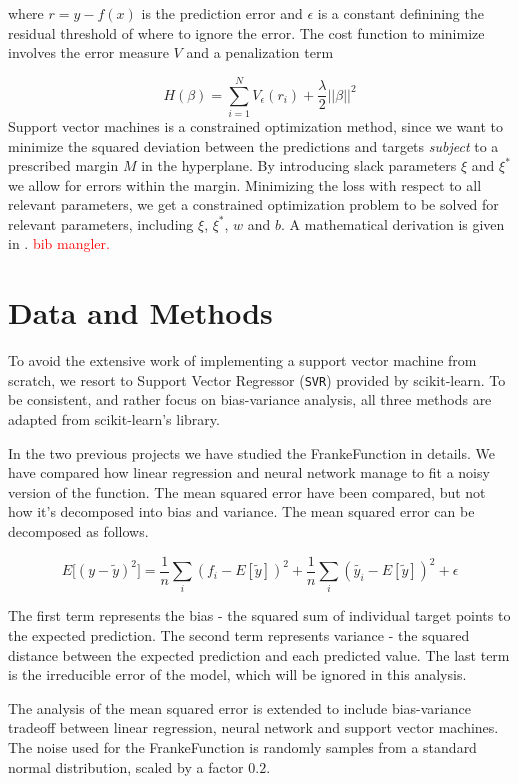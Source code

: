 \documentclass[a4paper]{article}
\def\code#1{\texttt{#1}}
\begin{document}
	where $r = y - f(x)$ is the prediction error and $\epsilon$ is a constant definining the residual threshold of where to ignore the error. The cost function to minimize involves the error measure $V$ and a penalization term
	
	\[ H(\beta) = \sum_{i=1}^N V_{\epsilon}(r_i) + \frac{\lambda}{2} ||\beta||^2 \]
	Support vector machines is a constrained optimization method, since we want to minimize the squared deviation between the predictions and targets \textit{subject} to a prescribed margin $M$ in the hyperplane. By introducing slack parameters $\xi$ and $\xi^*$ we allow for errors within the margin. Minimizing the loss with respect to all relevant parameters, we get a constrained optimization problem to be solved for relevant parameters, including $\xi$, $\xi^*$, $w$ and $b$. A mathematical derivation is given in \cite{Hastie2009}. \textcolor{red}{bib mangler.}
	
	
	
	\section{Data and Methods}
	To avoid the extensive work of implementing a support vector machine from scratch, we resort to Support Vector Regressor (\code{SVR}) provided by scikit-learn. To be consistent, and rather focus on bias-variance analysis, all three methods are adapted from scikit-learn's library.
	
	In the two previous projects we have studied the FrankeFunction in details. We have compared how linear regression and neural network manage to fit a noisy version of the function. The mean squared error have been compared, but not how it's decomposed into bias and variance. The mean squared error can be decomposed as follows.
	
	\[ E\big[(y - \tilde{y})^2\big] = \frac{1}{n}\sum_i (f_i - E[\tilde{y}])^2 + \frac{1}{n}\sum_i (\tilde{y_i} - E[\tilde{y}])^2 + \epsilon \]
	
	The first term represents the bias - the squared sum of individual target points to the expected prediction. The second term represents variance - the squared distance between the expected prediction and each predicted value. The last term is the irreducible error of the model, which will be ignored in this analysis.
	
	The analysis of the mean squared error is extended to include bias-variance tradeoff between linear regression, neural network and support vector machines. The noise used for the FrankeFunction is randomly samples from a standard normal distribution, scaled by a factor $0.2$. \\
	
\end{document}
